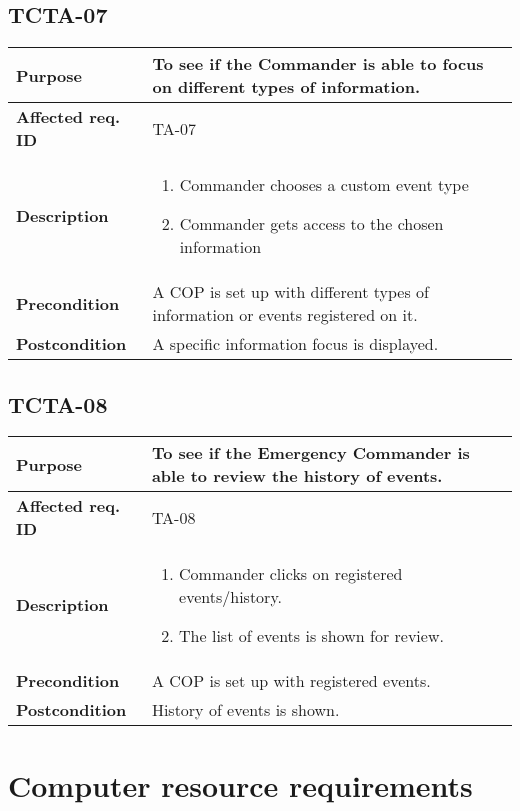 \subsection{TCTA-07}
\begin{tabular}{ l | m{11cm}}
	\textbf{Purpose}			& To see if the Commander is able to focus on different types of information.  \\ \hline
	\textbf{Affected req. ID}	& TA-07 \\ \hline
	\textbf{Description}		& \begin{enumerate}
		\item Commander chooses a custom event type \item Commander gets access to the chosen information
	\end{enumerate}\\
	\hline
	\textbf{Precondition}		& A COP is set up with different types of information or events registered on it.\\ \hline
	\textbf{Postcondition}		& A specific information focus is displayed.\\
\end{tabular}

\subsection{TCTA-08}
\begin{tabular}{ l | m{11cm}}
	\textbf{Purpose}			& To see if the Emergency Commander is able to review the history of events.  \\ \hline
	\textbf{Affected req. ID}	& TA-08 \\ \hline
	\textbf{Description}		& \begin{enumerate}
		\item Commander clicks on registered events/history. \item The list of events is shown for review.
	\end{enumerate}\\
	\hline
	\textbf{Precondition}		& A COP is set up with registered events.\\ \hline
	\textbf{Postcondition}		& History of events is shown.\\
\end{tabular}


\section{Computer resource requirements}
